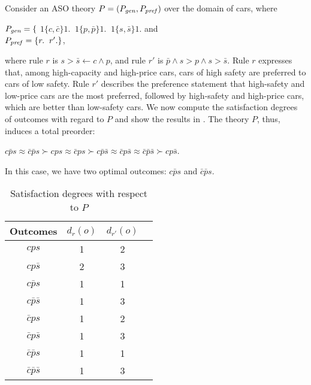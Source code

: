 Consider an ASO theory $P=(P_{\mathit{gen}}, P_{\mathit{pref}})$ over the domain 
of cars, where
\begin{center}
	$P_{\mathit{gen}}=\{$
	$1\{c,\bar{c}\}1.\;\; 1\{p,\bar{p}\}1.\;\; 1\{s,\bar{s}\}1.$
	and\\
	$P_{\mathit{pref}}=\{r.\;\; r'.\}$,
\end{center}
where rule $r$ is $s > \bar{s} \leftarrow c \land p$, 
and rule $r'$ is $\bar{p} \land s > p \land s > \bar{s}$.
Rule $r$ expresses that, among high-capacity and high-price cars,
cars of high safety are preferred to cars of low safety.
Rule $r'$ describes the preference statement that
high-safety and low-price cars are the most preferred, followed
by high-safety and high-price cars, which are better
than low-safety cars.
We now compute the satisfaction degrees of outcomes with regard to $P$
and show the results in .
The theory $P$, thus, induces a total preorder:
\begin{center}
	$c\bar{p}s \approx \bar{c}\bar{p}s \succ cps \approx \bar{c}ps \succ
		c\bar{p}\bar{s} \approx \bar{c}p\bar{s} \approx \bar{c}\bar{p}\bar{s} \succ
		cp\bar{s}$.
\end{center}
In this case, we have two optimal outcomes: $c\bar{p}s$ and $\bar{c}\bar{p}s$.

\begin{table}
  \centering
  \small
  \begin{tabular}{ |c||c|c|c| }
    \hline
    Outcomes                 & $d_r(o)$  & $d_{r'}(o)$ \\
    \hline \hline
    $cps$    								 & 1    & 2   \\
    \hline
    $cp\bar{s}$               & 2  & 3  \\
    \hline
    $c\bar{p} s$              & 1    & 1  \\
    \hline
    $c\bar{p}\bar{s}$          & 1  & 3    \\
    \hline
    $\bar{c} ps$              & 1  & 2    \\
    \hline
    $\bar{c} p\bar{s}$         & 1  & 3  \\
    \hline
    $\bar{c} \bar{p} s$        & 1 & 1 \\
    \hline
    $\bar{c} \bar{p} \bar{s}$   & 1  & 3   \\
    \hline
  \end{tabular}
  \caption{Satisfaction degrees with respect to $P$}
  \label{tbl:aso_ex}
\end{table}

